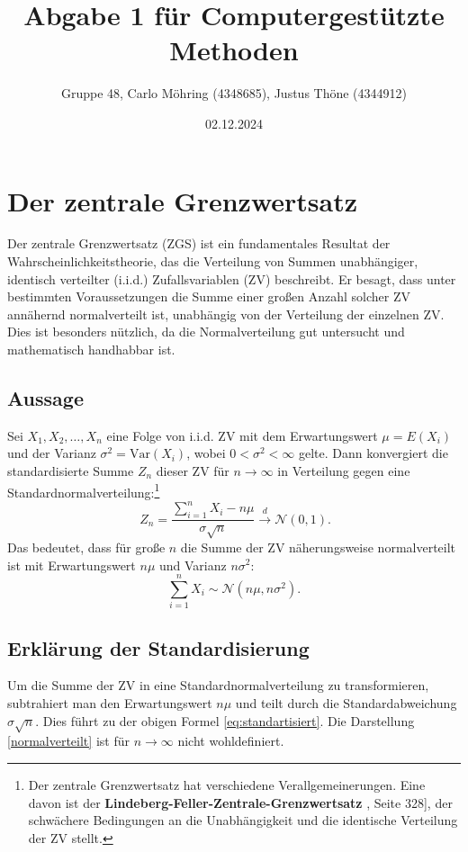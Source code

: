 \documentclass{article}
\title{Abgabe 1 für Computergestützte Methoden}
\author{Gruppe 48, Carlo Möhring (4348685), Justus Thöne (4344912)}
\date{02.12.2024}
\begin{document}
\maketitle
\tableofcontents

\newpage
\section{Der zentrale Grenzwertsatz}
Der zentrale Grenzwertsatz (ZGS) ist ein fundamentales Resultat der Wahrscheinlichkeitstheorie, das die Verteilung von Summen unabhängiger, identisch
verteilter (i.i.d.) Zufallsvariablen (ZV) beschreibt. Er besagt, dass unter bestimmten Voraussetzungen die Summe einer großen Anzahl solcher ZV annähernd
normalverteilt ist, unabhängig von der Verteilung der einzelnen ZV. Dies ist besonders nützlich, da die Normalverteilung gut untersucht und mathematisch
handhabbar ist.

\subsection{Aussage}
Sei \(X_1, X_2, \ldots, X_n\) eine Folge von i.i.d. ZV mit dem Erwartungswert \(\mu = E(X_i)\) und der Varianz \(\sigma^2 = \text{Var}(X_i)\), wobei \(0 < \sigma^2 < \infty\) gelte. Dann konvergiert die standardisierte Summe \(Z_n\) dieser ZV für \(n \to \infty\) in Verteilung gegen eine Standardnormalverteilung:\footnote{Der zentrale Grenzwertsatz hat verschiedene Verallgemeinerungen. Eine davon ist der
\textbf{Lindeberg-Feller-Zentrale-Grenzwertsatz} \cite{Klenke2013}, Seite 328], der schwächere Bedingungen an
die Unabhängigkeit und die identische Verteilung der ZV stellt.
}
\begin{equation}
    \label{eq:standartisiert}
    \ Z_n = \frac{\sum_{i=1}^n X_i - n\mu}{\sigma \sqrt{n}} \xrightarrow{d} \mathcal{N}(0, 1).
\end{equation}
Das bedeutet, dass für große \(n\) die Summe der ZV näherungsweise normalverteilt ist mit Erwartungswert \(n\mu\) und Varianz \(n\sigma^2\):
\begin{equation}
 \label{normalverteilt}
 \sum_{i=1}^n X_i \sim \mathcal{N}(n\mu, n\sigma^2).
\end{equation}

\subsection{Erklärung der Standardisierung}
Um die Summe der ZV in eine Standardnormalverteilung zu transformieren, subtrahiert man den Erwartungswert \(n\mu\) und teilt durch die Standardabweichung \(\sigma \sqrt{n}\). Dies führt zu der obigen Formel \eqref{eq:standartisiert}. Die Darstellung \eqref{normalverteilt} ist für \(n \to \infty\) nicht wohldefiniert.
\end{document}

